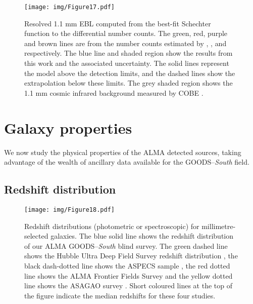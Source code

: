 \documentclass[longauth]{aa}
\begin{document}
\begin{figure}
\centering
\resizebox{\hsize}{!} {
\texttt{[image: img/Figure17.pdf]}
}
\caption{Resolved 1.1 mm EBL computed from the best-fit Schechter function to the differential number counts. The green, red, purple and brown lines are from the number counts estimated by \cite{Fujimoto2016}, \cite{Ono2014}, \cite{Hatsukade2016} and \cite{Carniani2015} respectively. The blue line and shaded region show the results from this work and the associated uncertainty. The solid lines represent the model above the detection limits, and the dashed lines show the extrapolation below these limits. The grey shaded region shows the 1.1 mm cosmic infrared background measured by COBE \citep{Fixsen1998}.}
   \label{fig:EBL}
\end{figure}

\section{Galaxy properties}\label{sec:Properties}
We now study the physical properties of the ALMA detected sources, taking advantage of the wealth of ancillary data available for the GOODS--\textit{South} field.

\subsection{Redshift distribution}

   \begin{figure}
   \centering
   \texttt{[image: img/Figure18.pdf]}
      \caption{Redshift distributions (photometric or spectroscopic) for millimetre-selected galaxies. The blue solid line shows the redshift distribution of our ALMA GOODS--\textit{South} blind survey. The green dashed line shows the Hubble Ultra Deep Field Survey redshift distribution \citep{Dunlop2017}, the black dash-dotted line shows the ASPECS sample \citep{Aravena2016}, the red dotted line shows the ALMA Frontier Fields Survey \citep{Gonzalez-Lopez2017} and the yellow dotted line shows the ASAGAO survey \citep{Ueda2018}. Short coloured lines at the top of the figure indicate the median redshifts for these four studies.}
         \label{redshift_distribution}
   \end{figure}
\end{document}
